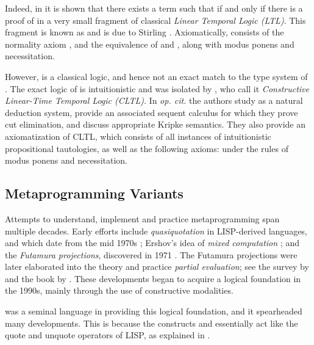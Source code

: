 \documentclass[a4paper]{amsart}
\begin{document}
Indeed, in \citep{Davies1996a} it is shown that there exists a term
 such that  if and only if there is a proof of
 in a very small fragment of classical \emph{Linear Temporal Logic
(LTL)}. This fragment is known as  and is due to
Stirling \cite[p. 516]{Stirling1993}. Axiomatically, 
consists of the normality axiom , and the
equivalence of  and , along
with modus ponens and necessitation.

However,  is a classical logic, and hence not an exact
match to the type system of . The exact logic of
 is intuitionistic and was isolated by
\cite{Kojima2011}, who call it \emph{Constructive Linear-Time
Temporal Logic (\textsf{CLTL})}. In \emph{op. cit.} the authors study
 as a natural deduction system, provide an
associated sequent calculus for which they prove cut elimination,
and discuss appropriate Kripke semantics. They also provide an
axiomatization of \textsf{CLTL}, which consists of all instances of
intuitionistic propositional tautologies, as well as the following
axioms:  under the rules of modus ponens and necessitation.

\subsection{Metaprogramming Variants}

Attempts to understand, implement and practice metaprogramming
span multiple decades. Early efforts include \emph{quasiquotation}
in LISP-derived languages, and which date from the mid 1970s
\citep{Bawden1999}; Ershov's idea of \emph{mixed computation}
\citep{Ershov1982}; and the \emph{Futamura projections},
discovered in 1971 \citep{Futamura1999}. The Futamura projections
were later elaborated into the theory and practice \emph{partial
evaluation}; see the survey by \cite{Jones1996} and the book by
\cite{Jones1993}. These developments began to acquire a logical
foundation in the 1990s, mainly through the use of constructive
modalities.

 was a seminal language in providing this
logical foundation, and it spearheaded many developments. This is
because the constructs  and 
essentially act like the quote and unquote operators of LISP, as
explained in \cite{Bawden1999}.
\end{document}
